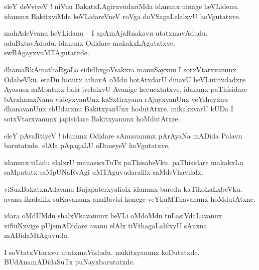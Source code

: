 \documentclass{article}
\begin{document}
\begin{mn}%
eleY deVviyeV ! niVnu BakatxLAgiruvudariMda idanunx ninage heVLidenu. idanunx BakitxyiMda 
keVLidareVneV roVga doVSagaLelalxvU hoVgutatxve.
\end{mn}


\begin{mn}%
mahAdeVvanu heVLidanu -- I apAmAjaRnakavu utatxmavAdudu. aduBxtavAdudu. idanunx Odidare 
makakxLAgutatxve. swBAgayxvuMTAgutatxde.
\end{mn}

\begin{mn}%
dhamaRkAmathaRgaLa sididhxgoVsakxra manuSayxnu I sotxVtarxvanunx OdabeVku. eraDu hotutx athavA oMdu 
hotAtxdarU dinavU heVLutitxdadxre Ayasusx saMpatutx bala ivelalxvU Avanige hecucxtatxve. idanunx 
paThisidare bArxhamxNanu videyxyanUnx kaSxtirxyanu rAjayxvanUnx veYshayxnu dhanavanUnx shUdarxnu 
BakitxyanUnx hodutAtxre. mikakxvarU kUDa I sotxVtarxvanunx japisidare Bakitxyanunx hoMdutAtxre.
\end{mn}

\begin{mn}%
eleY pAvaRtiyeV ! idanunx Odidare sAmavanunx pArAyaNa mADida Palavu barutatxde. elAla pApagaLU 
oDaneyeV hoVgutatxve.
\end{mn}

\begin{mn}%
idanunx tiLidu elalxrU manasisxTuTx paThisabeVku. paThisidare makakxLu saMpatutx saMpUNaRvAgi 
uMTAguvudaralilx saMdeVhavilalx.
\end{mn}

\begin{mn}%
viSuxBakatxnAdavanu Bujapaterxyaliolx idanunx baredu kaTikoLaLxbeVku. avanu ihadalilx suKavanunx 
anuBavisi konege veYkuMThavanunx hoMdutAtxne.
\end{mn}

\begin{mn}%
idara oMdUMdu shalxVkavanunx heVLi oMdoMdu tuLasiVdaLavanux viSuNxvige pUjemADidare avanu elAlx 
tiVthagaLalilxyU sAnxna mADidaMtAguvudu.
\end{mn}

\begin{mn}%
I soVtatxVtarxvu utatxmaVadudu. mukitxyanunx koDutatxde. BUdAnamADidaSuTx puNayxbarutatxde.
\end{mn}
\end{document}
